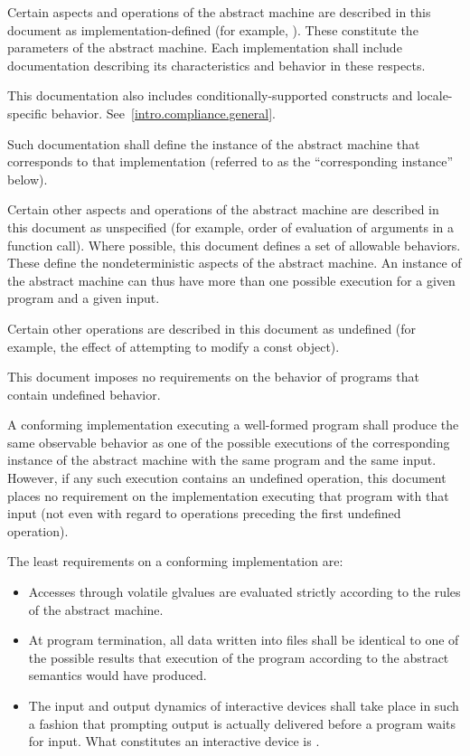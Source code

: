 \pnum
{}%
Certain aspects and operations of the abstract machine are described in this
document as implementation-defined (for example,
). These constitute the parameters of the abstract machine.
Each implementation shall include documentation describing its characteristics
and behavior in these respects.
\begin{footnote}
This documentation also includes
conditionally-supported constructs and locale-specific behavior.
See~\ref{intro.compliance.general}.
\end{footnote}
Such documentation shall define the instance of the
abstract machine that corresponds to that implementation (referred to as the
``corresponding instance'' below).

\pnum
{}%
Certain other aspects and operations of the abstract machine are
described in this document as unspecified (for example,
order of evaluation of arguments in a function call).
Where possible, this
document defines a set of allowable behaviors. These
define the nondeterministic aspects of the abstract machine. An instance
of the abstract machine can thus have more than one possible execution
for a given program and a given input.

\pnum
{}%
Certain other operations are described in this document as
undefined (for example, the effect of
attempting to modify a const object).
\begin{note}
This document imposes no requirements on the
behavior of programs that contain undefined behavior.
\end{note}

\pnum
{}%
%
A conforming implementation executing a well-formed program shall
produce the same observable behavior as one of the possible executions
of the corresponding instance of the abstract machine with the
same program and the same input.
%
However, if any such execution contains an undefined operation, this document places no
requirement on the implementation executing that program with that input
(not even with regard to operations preceding the first undefined
operation).

\pnum
{}%
The least requirements on a conforming implementation are:
\begin{itemize}
\item
Accesses through volatile glvalues are evaluated strictly according to the
rules of the abstract machine.
\item
At program termination, all data written into files shall be
identical to one of the possible results that execution of the program
according to the abstract semantics would have produced.
\item
The input and output dynamics of interactive devices shall take
place in such a fashion that prompting output is actually delivered before a program waits for input. What constitutes an interactive device is
.
\end{itemize}


